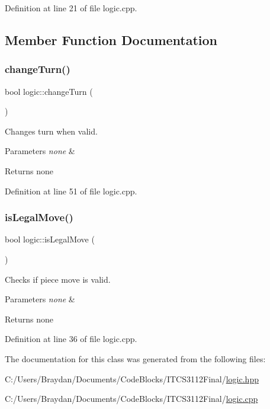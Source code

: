 Definition at line 21 of file logic.\+cpp.



\subsection{Member Function Documentation}
\mbox{\label{classlogic_ae9ff5d7c6cbe86bf69e338e9bb7c0d6c}} 
\subsubsection{\texorpdfstring{changeTurn()}{changeTurn()}}
{\footnotesize\ttfamily bool logic\+::change\+Turn (\begin{DoxyParamCaption}{ }\end{DoxyParamCaption})}

Changes turn when valid.


\begin{DoxyParams}{Parameters}
{\em none} & \\
\hline
\end{DoxyParams}
\begin{DoxyReturn}{Returns}
none 
\end{DoxyReturn}


Definition at line 51 of file logic.\+cpp.

\mbox{\label{classlogic_af7266d036a6df1328c85b8ea6bfb0fab}} 
\subsubsection{\texorpdfstring{isLegalMove()}{isLegalMove()}}
{\footnotesize\ttfamily bool logic\+::is\+Legal\+Move (\begin{DoxyParamCaption}{ }\end{DoxyParamCaption})}

Checks if piece move is valid.


\begin{DoxyParams}{Parameters}
{\em none} & \\
\hline
\end{DoxyParams}
\begin{DoxyReturn}{Returns}
none 
\end{DoxyReturn}


Definition at line 36 of file logic.\+cpp.



The documentation for this class was generated from the following files\+:\begin{DoxyCompactItemize}
\item 
C\+:/\+Users/\+Braydan/\+Documents/\+Code\+Blocks/\+I\+T\+C\+S3112\+Final/\mbox{\hyperlink{logic_8hpp}{logic.\+hpp}}\item 
C\+:/\+Users/\+Braydan/\+Documents/\+Code\+Blocks/\+I\+T\+C\+S3112\+Final/\mbox{\hyperlink{logic_8cpp}{logic.\+cpp}}\end{DoxyCompactItemize}
